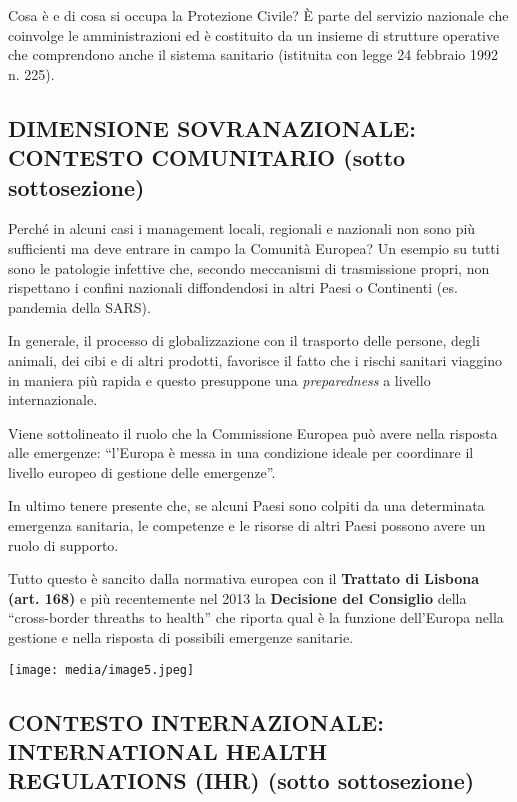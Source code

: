 \documentclass[]{article}
\begin{document}
Cosa è e di cosa si occupa la Protezione Civile? È parte del servizio
nazionale che coinvolge le amministrazioni ed è costituito da un insieme
di strutture operative che comprendono anche il sistema sanitario
(istituita con legge 24 febbraio 1992 n. 225).

\subsection{DIMENSIONE SOVRANAZIONALE: CONTESTO COMUNITARIO (sotto
sottosezione)}\label{dimensione-sovranazionale-contesto-comunitario-sotto-sottosezione}

Perché in alcuni casi i management locali, regionali e nazionali non
sono più sufficienti ma deve entrare in campo la Comunità Europea? Un
esempio su tutti sono le patologie infettive che, secondo meccanismi di
trasmissione propri, non rispettano i confini nazionali diffondendosi in
altri Paesi o Continenti (es. pandemia della SARS).

In generale, il processo di globalizzazione con il trasporto delle
persone, degli animali, dei cibi e di altri prodotti, favorisce il fatto
che i rischi sanitari viaggino in maniera più rapida e questo presuppone
una \emph{preparedness} a livello internazionale.

Viene sottolineato il ruolo che la Commissione Europea può avere nella
risposta alle emergenze: ``l'Europa è messa in una condizione ideale per
coordinare il livello europeo di gestione delle emergenze''.

In ultimo tenere presente che, se alcuni Paesi sono colpiti da una
determinata emergenza sanitaria, le competenze e le risorse di altri
Paesi possono avere un ruolo di supporto.

Tutto questo è sancito dalla normativa europea con il \textbf{Trattato
di Lisbona (art. 168)} e più recentemente nel 2013 la \textbf{Decisione
del Consiglio} della ``cross-border threaths to health'' che riporta
qual è la funzione dell'Europa nella gestione e nella risposta di
possibili emergenze sanitarie.

\texttt{[image: media/image5.jpeg]}

\subsection{CONTESTO INTERNAZIONALE: INTERNATIONAL HEALTH REGULATIONS
(IHR) (sotto
sottosezione)}\label{contesto-internazionale-international-health-regulations-ihr-sotto-sottosezione}
\end{document}
